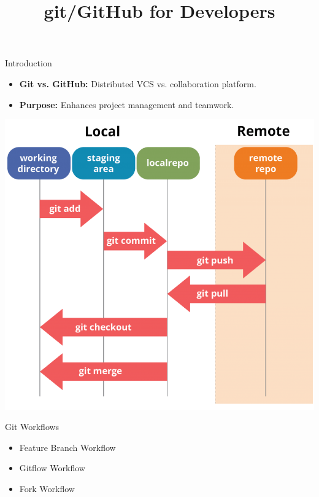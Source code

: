 \documentclass[aspectratio=169]{beamer}
\title{git/GitHub for Developers}
\institute{Engineers for Exploration, UC San Diego}
\begin{document}
\maketitle
\begin{frame}{Introduction}
    \begin{itemize}
        \item \textbf{Git vs. GitHub:} Distributed VCS vs. collaboration platform.
        \item \textbf{Purpose:} Enhances project management and teamwork.
    \end{itemize}
    \begin{center}
        \includegraphics[scale=.25]{git_commands.png}
    \end{center}
\end{frame}
\begin{frame}{Git Workflows}
    \begin{itemize}
        \item Feature Branch Workflow
        \item Gitflow Workflow
        \item Fork Workflow
    \end{itemize}
\end{frame}
\end{document}
